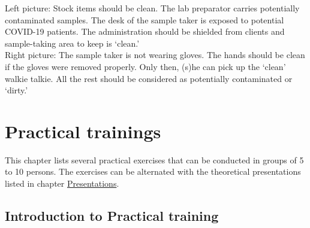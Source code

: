 \documentclass[
]{book}
\begin{document}
Left picture: Stock items should be clean. The lab preparator carries potentially contaminated samples. The desk of the sample taker is exposed to potential COVID-19 patients. The administration should be shielded from clients and sample-taking area to keep is `clean.'\\
Right picture: The sample taker is not wearing gloves. The hands should be clean if the gloves were removed properly. Only then, (s)he can pick up the `clean' walkie talkie. All the rest should be considered as potentially contaminated or `dirty.'

\hypertarget{pract}{%
\chapter{Practical trainings}\label{pract}}

This chapter lists several practical exercises that can be conducted in groups of 5 to 10 persons. The exercises can be alternated with the theoretical presentations listed in chapter \protect\hyperlink{presentations}{Presentations}.

\hypertarget{introduction-to-practical-training}{%
\section{Introduction to Practical training}\label{introduction-to-practical-training}}
\end{document}
